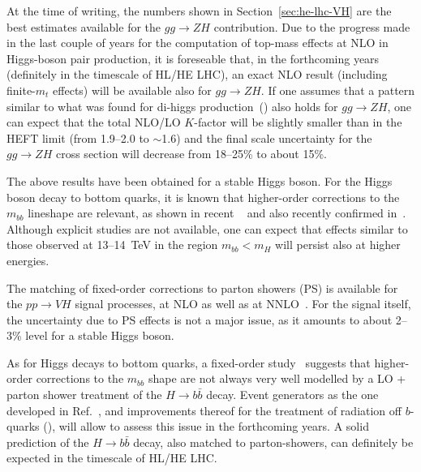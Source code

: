 
\label{sec:hl-lhc-VH}
At the time of writing, the numbers shown in Section~\ref{sec:he-lhc-VH}
are the best estimates
available for the $gg\rightarrow ZH$ contribution. Due to the progress made in the
last couple of years for the computation of top-mass effects at NLO in
Higgs-boson pair production, it is foreseable that, in the forthcoming years
(definitely in the timescale of HL/HE LHC), an exact NLO result
(including finite-$m_t$ effects) will be available also for $gg\rightarrow ZH$. If
one assumes that a pattern similar to what was found for di-higgs
production~(\cite{Borowka:2016ypz}) also holds for $gg\rightarrow ZH$, one can expect
that the total NLO/LO $K$-factor will be slightly smaller than in the
HEFT limit (from 1.9--2.0 to $\sim$1.6) and the final scale uncertainty for
the $gg\rightarrow ZH$ cross section will decrease from 18--25\% to about 15\%.


The above results have been obtained for a stable Higgs boson. For the
Higgs boson decay to bottom quarks, it is known that higher-order
corrections to the $m_{bb}$ lineshape are relevant, as shown in recent
~\cite{Ferrera:2017zex} and also recently confirmed in~\cite{Caola:2017xuq}.
Although explicit
studies are not available, one can expect that effects similar to
those observed at 13--14~TeV in the region $m_{bb}<m_H$ will persist also
at higher energies.

The matching of fixed-order corrections to parton showers (PS) is available
for the $pp\rightarrow VH$ signal processes, at NLO as well as at NNLO~\cite{Astill:2018ivh}.
For the signal itself, the uncertainty due to PS effects is not a major issue,
as it amounts to about 2--3\% level for a stable Higgs boson.

As for Higgs decays to bottom quarks, a fixed-order study~\cite{Caola:2017xuq}
suggests that higher-order corrections to the $m_{bb}$ shape are not always
very well modelled by a LO + parton shower treatment of the $H\to b\bar{b}$ decay.
%
Event generators as the one developed in Ref.~\cite{Astill:2018ivh}, and improvements thereof
for the treatment of radiation off $b$-quarks (\cite{Buonocore:2017lry}),
will allow to assess this issue in the forthcoming
years. A solid prediction of the $H\to b\bar{b}$ decay, also matched to
parton-showers, can definitely be expected in the timescale of HL/HE LHC.

